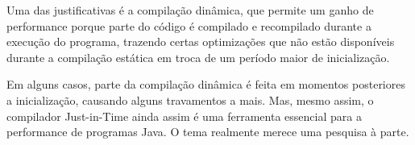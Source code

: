 \documentclass[12pt]{article}
\begin{document}
Uma das justificativas é a compilação dinâmica, que permite um ganho de performance
porque parte do código é compilado e recompilado durante
a execução do programa, trazendo certas optimizações que não estão
disponíveis durante a compilação estática em troca de um período maior de inicialização.

Em alguns casos, parte da compilação dinâmica é feita em momentos posteriores a inicialização, 
causando alguns travamentos a mais. Mas, mesmo assim, o compilador Just-in-Time
ainda assim é uma ferramenta essencial para a performance de programas Java. O tema realmente merece uma pesquisa à parte.



\printbibliography
\end{document}
